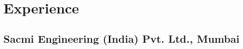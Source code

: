 \documentclass[11pt,a4paper,sans]{moderncv} %
\begin{document}

\newpage{}

\section{Experience}

\subsection{Sacmi Engineering (India) Pvt. Ltd., Mumbai}
\end{document}
